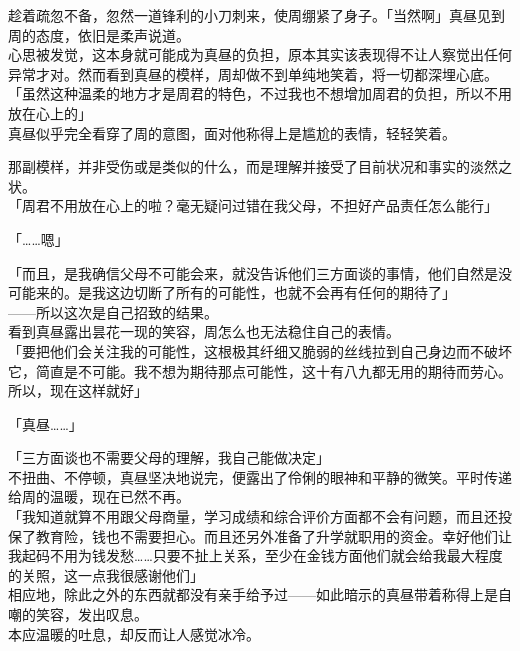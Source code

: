 趁着疏忽不备，忽然一道锋利的小刀刺来，使周绷紧了身子。「当然啊」真昼见到周的态度，依旧是柔声说道。\\

心思被发觉，这本身就可能成为真昼的负担，原本其实该表现得不让人察觉出任何异常才对。然而看到真昼的模样，周却做不到单纯地笑着，将一切都深埋心底。\\

「虽然这种温柔的地方才是周君的特色，不过我也不想增加周君的负担，所以不用放在心上的」\\

真昼似乎完全看穿了周的意图，面对他称得上是尴尬的表情，轻轻笑着。

那副模样，并非受伤或是类似的什么，而是理解并接受了目前状况和事实的淡然之状。\\

「周君不用放在心上的啦？毫无疑问过错在我父母，不担好产品责任怎么能行」

「……嗯」

「而且，是我确信父母不可能会来，就没告诉他们三方面谈的事情，他们自然是没可能来的。是我这边切断了所有的可能性，也就不会再有任何的期待了」\\

——所以这次是自己招致的结果。\\

看到真昼露出昙花一现的笑容，周怎么也无法稳住自己的表情。\\

「要把他们会关注我的可能性，这根极其纤细又脆弱的丝线拉到自己身边而不破坏它，简直是不可能。我不想为期待那点可能性，这十有八九都无用的期待而劳心。所以，现在这样就好」

「真昼……」

「三方面谈也不需要父母的理解，我自己能做决定」\\

不扭曲、不停顿，真昼坚决地说完，便露出了伶俐的眼神和平静的微笑。平时传递给周的温暖，现在已然不再。\\

「我知道就算不用跟父母商量，学习成绩和综合评价方面都不会有问题，而且还投保了教育险，钱也不需要担心。而且还另外准备了升学就职用的资金。幸好他们让我起码不用为钱发愁……只要不扯上关系，至少在金钱方面他们就会给我最大程度的关照，这一点我很感谢他们」\\

相应地，除此之外的东西就都没有亲手给予过——如此暗示的真昼带着称得上是自嘲的笑容，发出叹息。\\

本应温暖的吐息，却反而让人感觉冰冷。\\

